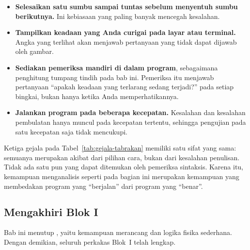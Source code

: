 \begin{itemize}
  \item \textbf{Selesaikan satu sumbu sampai tuntas sebelum menyentuh sumbu
        berikutnya.} Ini kebiasaan yang paling banyak mencegah kesalahan.
  \item \textbf{Tampilkan keadaan yang Anda curigai pada layar atau terminal.}
        Angka yang terlihat akan menjawab pertanyaan yang tidak dapat dijawab
        oleh gambar.
  \item \textbf{Sediakan pemeriksa mandiri di dalam program}, sebagaimana
        penghitung tumpang tindih pada bab ini. Pemeriksa itu menjawab
        pertanyaan ``apakah keadaan yang terlarang sedang terjadi?'' pada
        setiap bingkai, bukan hanya ketika Anda memperhatikannya.
  \item \textbf{Jalankan program pada beberapa kecepatan.} Kesalahan
         dan kesalahan pembulatan hanya muncul pada
        kecepatan tertentu, sehingga pengujian pada satu kecepatan saja tidak
        mencukupi.
\end{itemize}

\begin{catatabox}
Ketiga gejala pada Tabel~\ref{tab:gejala-tabrakan} memiliki
satu sifat yang sama: semuanya merupakan akibat dari pilihan cara, bukan dari
kesalahan penulisan. Tidak ada satu pun yang dapat ditemukan oleh pemeriksa
sintaksis. Karena itu, kemampuan menganalisis seperti pada bagian ini merupakan
kemampuan yang membedakan program yang ``berjalan'' dari program yang
``benar''.
\end{catatabox}

\subsection{Mengakhiri Blok I}

Bab ini menutup , yaitu kemampuan merancang  dan
logika fisika sederhana. Dengan demikian, seluruh perkakas Blok~I telah
lengkap.

